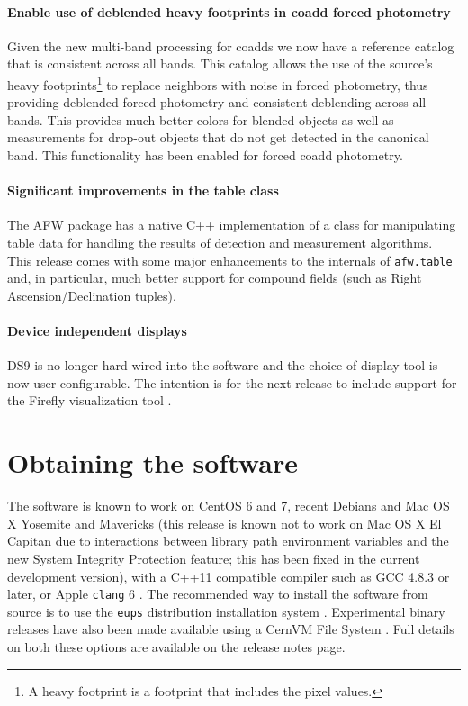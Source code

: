 \documentclass[11pt,twoside]{article}
\begin{document}
\paragraph{Enable use of deblended heavy footprints in coadd forced
  photometry} Given the new multi-band processing for coadds we now
have a reference catalog that is consistent across all bands. This
catalog allows the use of the source's heavy footprints\footnote{A
  heavy footprint is a footprint that includes the pixel values.} to
replace neighbors with noise in forced photometry, thus providing
deblended forced photometry and consistent deblending across all
bands. This provides much better colors for blended objects as well as
measurements for drop-out objects that do not get detected in the
canonical band. This functionality has been enabled for forced coadd
photometry.

\paragraph{Significant improvements in the table class} The AFW package
has a native C++ implementation of a class for manipulating table data
for handling the results of detection and measurement
algorithms. This release comes with some major enhancements to the
internals of \texttt{afw.table} and, in particular, much better
support for compound fields (such as Right Ascension/Declination tuples).

\paragraph{Device independent displays} DS9
\citep{2011ASPC..442..633J} is no longer hard-wired into the software
and the choice of display tool is now user configurable.  The
intention is for the next release to include support for the Firefly
visualization tool \citep{O10-1_adassxxv}.

\section{Obtaining the software}

The software is known to work on CentOS 6 and 7, recent Debians and
Mac OS X Yosemite and Mavericks (this release is known not to
  work on Mac OS X El Capitan due to interactions between library path
  environment variables and the new System Integrity Protection
  feature; this has been fixed in the current development version), with a C++11 compatible compiler such as GCC 4.8.3 or later, or
Apple \texttt{clang} 6 . The recommended way to install the software from source is to
use the \texttt{eups} distribution installation system
\citep{EUPS}. Experimental binary releases have also been
made available using a CernVM File
System \citep[CernVM-FS;][]{2015JPhCS.608a2031M}. Full details on both
these options are available on the release notes page.
\end{document}

